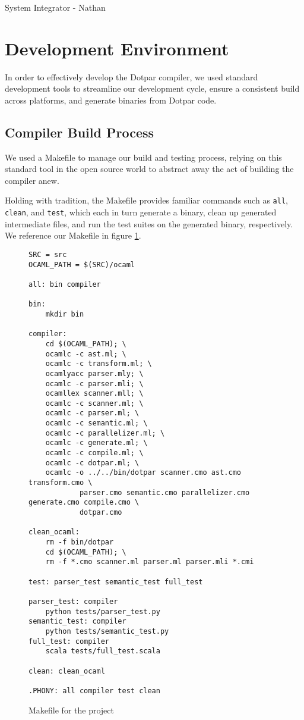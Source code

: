 System Integrator - Nathan

\section{Development Environment}

In order to effectively develop the Dotpar compiler, we used standard
development tools to streamline our development cycle, ensure a
consistent build across platforms, and generate binaries from Dotpar
code.

\subsection{Compiler Build Process}

We used a Makefile to manage our build and testing process, relying on
this standard tool in the open source world to abstract away the act
of building the compiler anew.

Holding with tradition, the Makefile provides familiar commands such
as \texttt{all}, \texttt{clean}, and \texttt{test}, which each in turn
generate a binary, clean up generated intermediate files, and run the
test suites on the generated binary, respectively. We reference our
Makefile in figure \ref{makefile}.

\begin{figure}[H]
\begin{verbatim}
SRC = src
OCAML_PATH = $(SRC)/ocaml

all: bin compiler

bin:
	mkdir bin

compiler:
	cd $(OCAML_PATH); \
	ocamlc -c ast.ml; \
	ocamlc -c transform.ml; \
	ocamlyacc parser.mly; \
	ocamlc -c parser.mli; \
	ocamllex scanner.mll; \
	ocamlc -c scanner.ml; \
	ocamlc -c parser.ml; \
	ocamlc -c semantic.ml; \
	ocamlc -c parallelizer.ml; \
	ocamlc -c generate.ml; \
	ocamlc -c compile.ml; \
	ocamlc -c dotpar.ml; \
	ocamlc -o ../../bin/dotpar scanner.cmo ast.cmo transform.cmo \
			parser.cmo semantic.cmo parallelizer.cmo generate.cmo compile.cmo \
			dotpar.cmo

clean_ocaml:
	rm -f bin/dotpar
	cd $(OCAML_PATH); \
	rm -f *.cmo scanner.ml parser.ml parser.mli *.cmi

test: parser_test semantic_test full_test

parser_test: compiler
	python tests/parser_test.py
semantic_test: compiler
	python tests/semantic_test.py
full_test: compiler
	scala tests/full_test.scala

clean: clean_ocaml

.PHONY: all compiler test clean
\end{verbatim}
\caption{Makefile for the project}
\label{makefile}
\end{figure}


